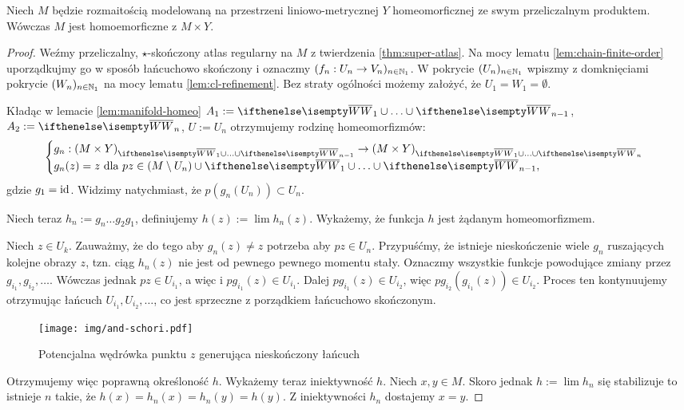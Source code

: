 \begin{thm}
  Niech $M$ będzie rozmaitością modelowaną na przestrzeni liniowo-metrycznej $Y$ homeomorficznej ze swym przeliczalnym produktem. Wówczas $M$ jest homoemorficzne z $M\times Y$.
  
  \begin{proof}
    Weźmy przeliczalny, $\star$-skończony atlas regularny na $M$ z twierdzenia \ref{thm:super-atlas}. Na mocy lematu \ref{lem:chain-finite-order} uporządkujmy go w sposób łańcuchowo skończony i oznaczmy $(f_n: U_n \to V_n)_{n\in{\mathbb{N}_1}}$. W pokrycie $(U_n)_{n\in{\mathbb{N}_1}}$ wpiszmy z domknięciami pokrycie $(W_n)_{n\in{\mathbb{N}_1}}$ na mocy lematu \ref{lem:cl-refinement}. Bez straty ogólności możemy założyć, że $U_1 = W_1 = \emptyset$.
    
    Kładąc w lemacie \ref{lem:manifold-homeo} $A_1 := \cl W_1 \cup\ldots\cup \cl W_{n-1}$, $A_2 := \cl W_{n}$, $U := U_n$ otrzymujemy rodzinę homeomorfizmów:
    \[
      \begin{cases}
        g_n: (M\times Y)_{\cl W_1 \cup\ldots\cup \cl W_{n-1}} \to (M\times Y)_{\cl W_1 \cup\ldots\cup \cl W_n}& \\
        g_n(z) = z\mbox{ dla }pz\in (M\setminus U_n)\cup \cl W_1 \cup\ldots\cup \cl W_{n-1},
      \end{cases}
    \]
    gdzie $g_1 = \operatorname{id}$. Widzimy natychmiast, że $p(g_n(U_n)) \subset U_n$.
    
    Niech teraz $h_n := g_n \ldots g_2 g_1$, definiujemy $h(z) := \lim h_n(z)$. Wykażemy, że funkcja $h$ jest żądanym homeomorfizmem.
    
    Niech $z \in U_k$. Zauważmy, że do tego aby $g_n(z) \neq z$ potrzeba aby $pz \in U_n$. Przypuśćmy, że istnieje nieskończenie wiele $g_n$ ruszających kolejne obrazy $z$, tzn. ciąg $h_n(z)$ nie jest od pewnego pewnego momentu stały. Oznaczmy wszystkie funkcje powodujące zmiany przez $g_{i_1}, g_{i_2}, \dots$. Wówczas jednak $pz \in U_{i_1}$, a więc i $p g_{i_1}(z) \in U_{i_1}$. Dalej $p g_{i_1}(z) \in U_{i_2}$, więc $p g_{i_2}(g_{i_1}(z)) \in U_{i_2}$. Proces ten kontynuujemy otrzymując łańcuch $U_{i_1}, U_{i_2}, \dots$, co jest sprzeczne z porządkiem łańcuchowo skończonym.
    
    \begin{figure}[h!]
      \centering
      \texttt{[image: img/and-schori.pdf]}
      \caption{Potencjalna wędrówka punktu $z$ generująca nieskończony łańcuch}
    \end{figure}
    
    Otrzymujemy więc poprawną określoność $h$. Wykażemy teraz iniektywność $h$. Niech $x, y \in M$. Skoro jednak $h := \lim h_n$ się stabilizuje to istnieje $n$ takie, że $h(x) = h_n(x) = h_n(y) = h(y)$. Z iniektywności $h_n$ dostajemy $x = y$.
    

\end{proof}
\end{thm}
